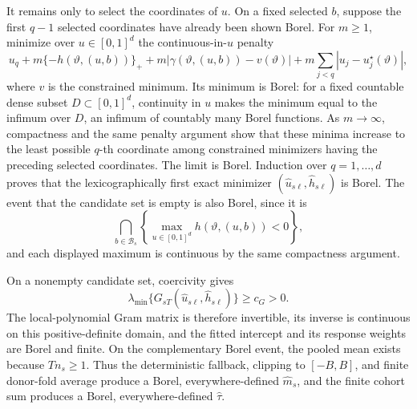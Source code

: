 It remains only to select the coordinates of \(u\).  On a fixed selected \(b\), suppose the first \(q-1\) selected coordinates have already been shown Borel.  For \(m\ge1\), minimize over \(u\in[0,1]^d\) the continuous-in-\(u\) penalty
\[
 u_q+m\{-h(\vartheta,(u,b))\}_+
 +m\left|\gamma(\vartheta,(u,b))-v(\vartheta)\right|
 +m\sum_{j<q}|u_j-u_j^\star(\vartheta)|,
\]
where \(v\) is the constrained minimum.  Its minimum is Borel: for a fixed countable dense subset \(D\subset[0,1]^d\), continuity in \(u\) makes the minimum equal to the infimum over \(D\), an infimum of countably many Borel functions.  As \(m\to\infty\), compactness and the same penalty argument show that these minima increase to the least possible \(q\)-th coordinate among constrained minimizers having the preceding selected coordinates.  The limit is Borel.  Induction over \(q=1,\ldots,d\) proves that the lexicographically first exact minimizer \((\widehat u_{s\ell},\widehat h_{s\ell})\) is Borel.  The event that the candidate set is empty is also Borel, since it is
\[
 \bigcap_{b\in\mathcal B_s}
 \left\{\max_{u\in[0,1]^d}h(\vartheta,(u,b))<0\right\},
\]
and each displayed maximum is continuous by the same compactness argument.

On a nonempty candidate set, coercivity gives
\[
 \lambda_{\min}\{G_{sT}(\widehat u_{s\ell},\widehat h_{s\ell})\}
 \ge c_G>0.
\]
The local-polynomial Gram matrix is therefore invertible, its inverse is continuous on this positive-definite domain, and the fitted intercept and its response weights are Borel and finite.  On the complementary Borel event, the pooled mean exists because \(Tn_s\ge1\).  Thus the deterministic fallback, clipping to \([-B,B]\), and finite donor-fold average produce a Borel, everywhere-defined \(\widehat m_s\), and the finite cohort sum produces a Borel, everywhere-defined \(\widehat\tau\).

